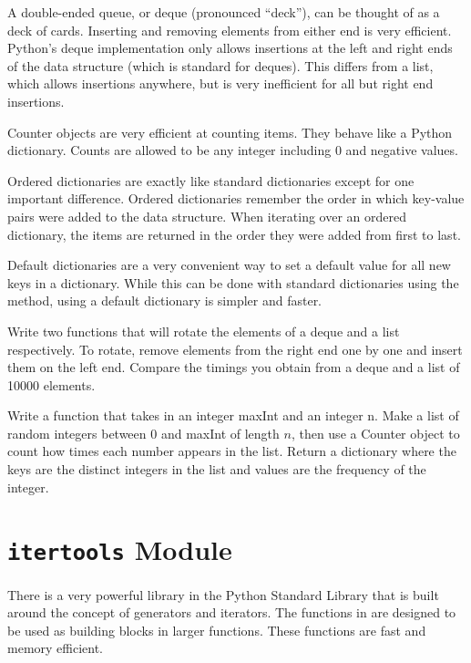 A double-ended queue, or deque (pronounced ``deck''), can be thought of as a deck of cards.
Inserting and removing elements from either end is very efficient.
Python's deque implementation only allows insertions at the left and right ends of the data structure (which is standard for deques).
This differs from a list, which allows insertions anywhere, but is very inefficient for all but right end insertions.
 
Counter objects are very efficient at counting items.  They behave like a Python dictionary.  Counts are allowed to be any integer including 0 and negative values.
 
Ordered dictionaries are exactly like standard dictionaries except for one important difference.
Ordered dictionaries remember the order in which key-value pairs were added to the data structure.
When iterating over an ordered dictionary, the items are returned in the order they were added from first to last.

Default dictionaries are a very convenient way to set a default value for all new keys in a dictionary.
While this can be done with standard dictionaries using the  method, using a default dictionary is simpler and faster.

\begin{problem}
Write two functions that will rotate the elements of a deque and a list respectively.
To rotate, remove elements from the right end one by one and insert them on the left end.
Compare the timings you obtain from a deque and a list of 10000 elements.
\end{problem}

\begin{problem}
Write a function that takes in an integer maxInt and an integer n.
Make a list of random integers between 0 and maxInt of length $n$, then use a Counter object to count how times each number appears in the list.
Return a dictionary where the keys are the distinct integers in the list and values are the frequency of the integer.
\end{problem}

\section*{\texttt{itertools} Module}
There is a very powerful library in the Python Standard Library that is built around the concept
of generators and iterators.  The functions in  are designed to be used as
building blocks in larger functions.  These functions are fast and memory efficient.

